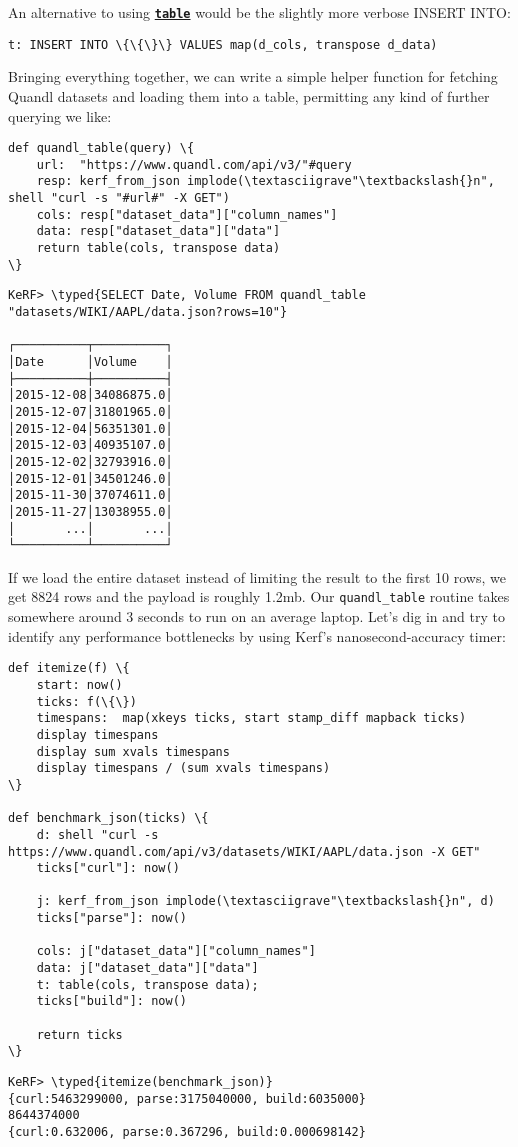 \documentclass{article}
\newcommand{\typed}[1]{\textcolor{TealBlue}{#1}}
\newcommand{\primu}[2]{\hyperref[prim:#2]{\textbf{\texttt{#1}}}}
\newcommand{\prim}[1]{\primu{#1}{#1}}
\begin{document}
An alternative to using \prim{table} would be the slightly more verbose INSERT INTO:
\begin{Verbatim}
t: INSERT INTO \{\{\}\} VALUES map(d_cols, transpose d_data)
\end{Verbatim}

Bringing everything together, we can write a simple helper function for fetching Quandl datasets and loading them into a table, permitting any kind of further querying we like:

\begin{Verbatim}
def quandl_table(query) \{
	url:  "https://www.quandl.com/api/v3/"#query
	resp: kerf_from_json implode(\textasciigrave"\textbackslash{}n", shell "curl -s "#url#" -X GET")
	cols: resp["dataset_data"]["column_names"]
	data: resp["dataset_data"]["data"]
	return table(cols, transpose data)
\}
\end{Verbatim}
\begin{Verbatim}
KeRF> \typed{SELECT Date, Volume FROM quandl_table "datasets/WIKI/AAPL/data.json?rows=10"}

┌──────────┬──────────┐
│Date      │Volume    │
├──────────┼──────────┤
│2015-12-08│34086875.0│
│2015-12-07│31801965.0│
│2015-12-04│56351301.0│
│2015-12-03│40935107.0│
│2015-12-02│32793916.0│
│2015-12-01│34501246.0│
│2015-11-30│37074611.0│
│2015-11-27│13038955.0│
│       ...│       ...│
└──────────┴──────────┘
\end{Verbatim}

\pagebreak
If we load the entire dataset instead of limiting the result to the first 10 rows, we get 8824 rows and the payload is roughly 1.2mb. Our \texttt{quandl\_table} routine takes somewhere around 3 seconds to run on an average laptop. Let's dig in and try to identify any performance bottlenecks by using Kerf's nanosecond-accuracy timer:

\begin{Verbatim}
def itemize(f) \{
	start: now()
	ticks: f(\{\})
	timespans:  map(xkeys ticks, start stamp_diff mapback ticks)
	display timespans
	display sum xvals timespans
	display timespans / (sum xvals timespans)
\}

def benchmark_json(ticks) \{
	d: shell "curl -s https://www.quandl.com/api/v3/datasets/WIKI/AAPL/data.json -X GET"
	ticks["curl"]: now()

	j: kerf_from_json implode(\textasciigrave"\textbackslash{}n", d)
	ticks["parse"]: now()
	
	cols: j["dataset_data"]["column_names"]
	data: j["dataset_data"]["data"]
	t: table(cols, transpose data);
	ticks["build"]: now()

	return ticks
\}
\end{Verbatim}
\begin{Verbatim}
KeRF> \typed{itemize(benchmark_json)}
{curl:5463299000, parse:3175040000, build:6035000}
8644374000
{curl:0.632006, parse:0.367296, build:0.000698142}
\end{Verbatim}
\end{document}
